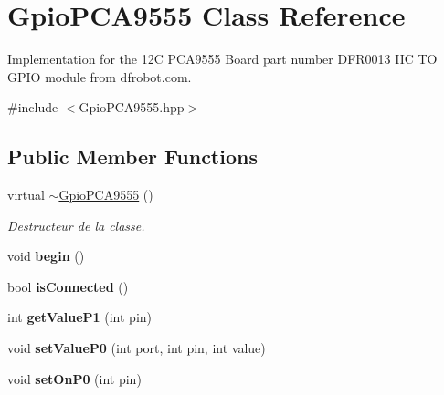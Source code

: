 \hypertarget{classGpioPCA9555}{}\section{Gpio\+P\+C\+A9555 Class Reference}
\label{classGpioPCA9555}


Implementation for the 12C P\+C\+A9555 Board part number D\+F\+R0013 I\+IC TO G\+P\+IO module from dfrobot.\+com.  




{\ttfamily \#include $<$Gpio\+P\+C\+A9555.\+hpp$>$}

\subsection*{Public Member Functions}
\begin{DoxyCompactItemize}
\item 
\mbox{\label{classGpioPCA9555_a3f8929052c69810d59ef143e94af23ad}} 
virtual \hyperlink{classGpioPCA9555_a3f8929052c69810d59ef143e94af23ad}{$\sim$\+Gpio\+P\+C\+A9555} ()
\begin{DoxyCompactList}\small\item\em Destructeur de la classe. \end{DoxyCompactList}\item 
\mbox{\label{classGpioPCA9555_a449f0a1c42549950193db56296758e50}} 
void {\bfseries begin} ()
\item 
\mbox{\label{classGpioPCA9555_adca3966252205ecd62523e39fc8e02d2}} 
bool {\bfseries is\+Connected} ()
\item 
\mbox{\label{classGpioPCA9555_a22dbebb8c5fffe0d0c119c6d958276e7}} 
int {\bfseries get\+Value\+P1} (int pin)
\item 
\mbox{\label{classGpioPCA9555_a275bd8ed5c0b8bf2e22ea488ecf06456}} 
void {\bfseries set\+Value\+P0} (int port, int pin, int value)
\item 
\mbox{\label{classGpioPCA9555_a6cde1194bb5855ed2e59c7f29ba5e81e}} 
void {\bfseries set\+On\+P0} (int pin)
\item 
\mbox{\label{classGpioPCA9555_aec22091c7c82bb5d1723cdecaf968a7a}} 

\end{DoxyCompactItemize}
